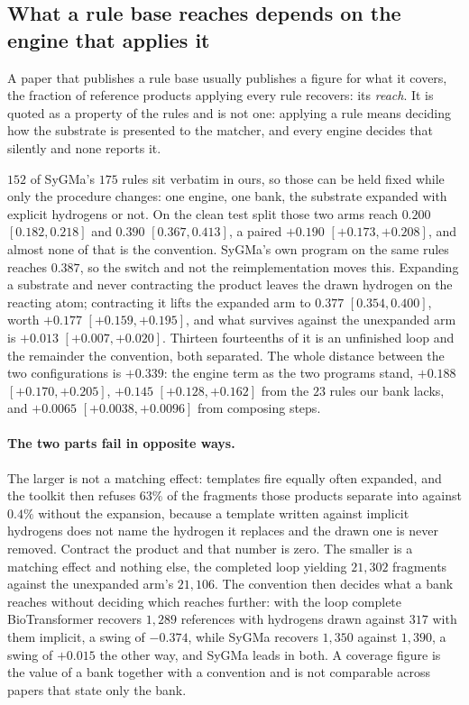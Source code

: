 \subsection{What a rule base reaches depends on the engine that applies it}
\label{sec:enginereach}

A paper that publishes a rule base usually publishes a figure for what it covers, the fraction of
reference products applying every rule recovers: its \emph{reach}. It is quoted as a property of the
rules and is not one: applying a rule means deciding how the substrate is presented to the matcher,
and every engine decides that silently and none reports it.

$152$ of SyGMa's $175$ rules sit verbatim in ours, so those can be held fixed while only the
procedure changes: one engine, one bank, the substrate expanded with explicit hydrogens or not. On
the clean test split those two arms reach $0.200$ $[0.182,0.218]$ and $0.390$ $[0.367,0.413]$, a
paired $+0.190$ $[+0.173,+0.208]$, and almost none of that is the convention. SyGMa's own program on the same rules
reaches $0.387$, so the switch and not the reimplementation moves this. Expanding a substrate and never contracting the product leaves the
drawn hydrogen on the reacting atom; contracting it lifts the expanded arm to $0.377$
$[0.354,0.400]$, worth $+0.177$ $[+0.159,+0.195]$, and what survives against the unexpanded arm is
$+0.013$ $[+0.007,+0.020]$. Thirteen fourteenths of it is an unfinished loop and the
remainder the convention, both separated. The whole distance between the two configurations is $+0.339$: the
engine term as the two programs stand, $+0.188$ $[+0.170,+0.205]$, $+0.145$ $[+0.128,+0.162]$ from
the $23$ rules our bank lacks, and $+0.0065$ $[+0.0038,+0.0096]$ from composing steps.

\paragraph{The two parts fail in opposite ways.} The larger is not a matching effect: templates fire
equally often expanded, and the toolkit then refuses $63\%$ of the fragments those products separate
into against $0.4\%$ without the expansion, because a template written against implicit hydrogens
does not name the hydrogen it replaces and the drawn one is never removed. Contract the product and
that number is zero. The smaller is a matching effect and nothing else, the completed loop yielding
$21{,}302$ fragments against the unexpanded arm's $21{,}106$. The convention then
decides what a bank reaches without deciding which reaches further: with the loop complete
BioTransformer recovers $1{,}289$ references with hydrogens drawn against $317$ with them implicit,
a swing of $-0.374$, while SyGMa recovers $1{,}350$ against $1{,}390$, a swing of $+0.015$ the other
way, and SyGMa leads in both. A coverage figure is the value of a bank together with a convention
and is not comparable across papers that state only the bank.

